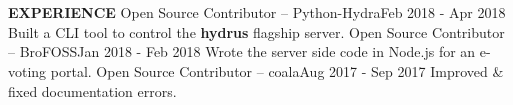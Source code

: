 \documentclass[a4paper, 12pt]{article}
\begin{document}
\section*{}
\begin{vwcol}[widths={0.2, 0.8}, justify=flush, sep=0.7cm, rule=0pt, indent=1em]
\large{\textbf{\textcolor{uclagold}{EXPERIENCE}}}\newline\newline\newline\newline\newline\newline\newline\newline\newline\newline\newline
\large{Open Source Contributor -- \textcolor{frenchblue}{Python-Hydra}}\hspace{3cm}\tiny{Feb 2018 - Apr 2018}\vspace{-0.05cm}\newline
\small{Built a CLI tool to control the \textbf{hydrus} flagship server.}\vspace{0.2cm}\newline
\large{Open Source Contributor -- \textcolor{frenchblue}{BroFOSS}}\hspace{4.1cm}\tiny{Jan 2018 - Feb 2018}\vspace{-0.05cm}\newline
\small{Wrote the server side code in Node.js for an e-voting portal.}\vspace{0.2cm}\newline
\large{Open Source Contributor -- \textcolor{frenchblue}{coala}}\hspace{5cm}\tiny{Aug 2017 - Sep 2017}\vspace{-0.05cm}\newline
\small{Improved \& fixed documentation errors.}\vspace{0.2cm}
\normalsize
\end{vwcol}

\vspace{-3cm}
\end{document}
